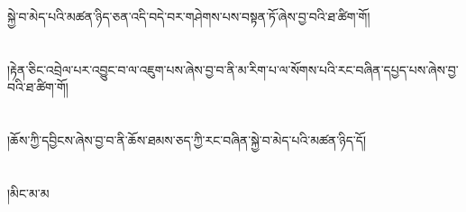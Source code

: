 སྐྱེ་བ་མེད་པའི་མཚན་ཉིད་ཅན་འདི་བདེ་བར་གཤེགས་པས་བསྟན་ཏོ་ཞེས་བྱ་བའི་ཐ་ཚིག་གོ།\chapter{ }།རྟེན་ཅིང་འབྲེལ་པར་འབྱུང་བ་ལ་འཇུག་པས་ཞེས་བྱ་བ་ནི་མ་རིག་པ་ལ་སོགས་པའི་རང་བཞིན་དཔྱད་པས་ཞེས་བྱ་བའི་ཐ་ཚིག་གོ།\chapter{ }།ཆོས་ཀྱི་དབྱིངས་ཞེས་བྱ་བ་ནི་ཆོས་ཐམས་ཅད་ཀྱི་རང་བཞིན་སྐྱེ་བ་མེད་པའི་མཚན་ཉིད་དོ།\chapter{ }།མིང་མ་མ